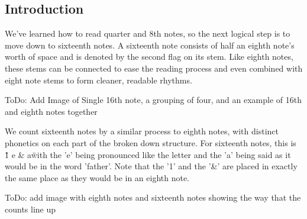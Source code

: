 \documentclass[12pt,letterpaper]{book}
\begin{document}
\subsection{Introduction}

We've learned how to read quarter and 8th notes, so the next logical step is to move down to sixteenth notes.  A sixteenth note consists of half an eighth note's worth of space and is denoted by the second flag on its stem.  Like eighth notes, these stems can be connected to ease the reading process and even combined with eight note stems to form cleaner, readable rhythms.

ToDo:  Add Image of Single 16th note, a grouping of four, and an example of 16th and eighth notes together

We count sixteenth notes by a similar process to eighth notes, with distinct phonetics on each part of the broken down structure.  For sixteenth notes, this is \"1 \+ e \+  \& \+ a\" with the 'e' being pronounced like the letter and the 'a' being said as it would be in the word 'father'.  Note that the '1' and the '&' are placed in exactly the same place as they would be in an eighth note.

ToDo: add image with eighth notes and sixteenth notes showing the way that the counts line up

\subsection{}
\end{document}
